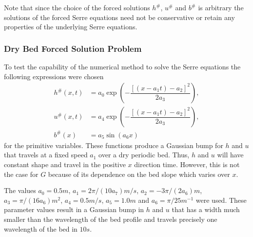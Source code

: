 \documentclass[AMA,STIX1COL]{WileyNJD-v2}
\begin{document}
Note that since the choice of the forced solutions $h^\#$, $u^\#$ and $b^\#$ is arbitrary the solutions of the forced Serre equations need not be conservative or retain any properties of the underlying Serre equations. 

\subsubsection{Dry Bed Forced Solution Problem}
To test the capability of the numerical method to solve the Serre equations the following expressions were chosen
\begin{subequations}
	\begin{align}
	\label{eqn:ForcedSolutionxt}
	h^\#(x,t) &=  a_0 \exp\left(-\dfrac{\left[\left(x - a_1 t\right) - a_2\right]^2}{2 a_3}\right), \\
	u^\#(x,t) &= a_4 \exp\left(-\dfrac{\left[\left(x - a_1 t\right) - a_2\right]^2}{2 a_3}\right), \\
	b^\#(x) &= a_5 \sin\left(a_6 x\right)
	\end{align}
\end{subequations}
for the primitive variables. These functions produce a Gaussian bump for $h$ and $u$ that travels at a fixed speed $a_1$ over a dry periodic bed. Thus, $h$ and $u$ will have constant shape and travel in the positive $x$ direction time. However, this is not the case for $G$ because of its dependence on the bed slope which varies over $x$.

The values $a_0 = 0.5m$, $a_1 = 2 \pi / \left(10 a_7\right) m/s$, $a_2 =- 3\pi/ \left(2 a_6\right)m$, $a_3 = \pi / (16 a_6) m^2$, $a_4 = 0.5 m/s$, $a_5 = 1.0 m$ and $a_6 = \pi / 25 m^{-1}$ were used. These parameter values result in a Gaussian bump in $h$ and $u$ that has a width much smaller than the wavelength of the bed profile and travels precisely one wavelength of the bed in $10s$. 
\end{document}
